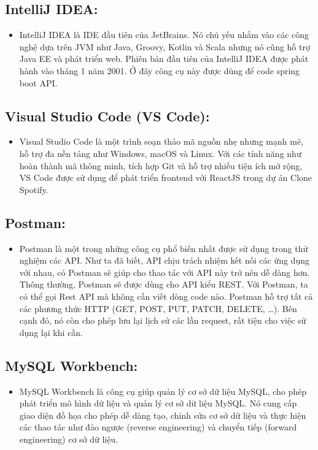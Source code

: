 \subsection{IntelliJ IDEA:}
\begin{itemize}
    \item IntelliJ IDEA là IDE đầu tiên của JetBrains. Nó chủ yếu nhắm vào các công nghệ dựa trên JVM như Java, Groovy, Kotlin và Scala nhưng nó cũng hỗ trợ Java EE và phát triển web. Phiên bản đầu tiên của IntelliJ IDEA được phát hành vào tháng 1 năm 2001. Ở đây công cụ này được dùng để code spring boot API.
\end{itemize}

\subsection{Visual Studio Code (VS Code):}
\begin{itemize}
    \item Visual Studio Code là một trình soạn thảo mã nguồn nhẹ nhưng mạnh mẽ, hỗ trợ đa nền tảng như Windows, macOS và Linux. Với các tính năng như hoàn thành mã thông minh, tích hợp Git và hỗ trợ nhiều tiện ích mở rộng, VS Code được sử dụng để phát triển frontend với ReactJS trong dự án Clone Spotify.
\end{itemize}

\subsection{Postman:}
\begin{itemize}
    \item Postman là một trong những công cụ phổ biến nhất được sử dụng trong thử nghiệm các API. Như ta đã biết, API chịu trách nhiệm kết nối các ứng dụng với nhau, có Postman sẽ giúp cho thao tác với API này trở nên dễ dàng hơn. Thông thường, Postman sẽ được dùng cho API kiểu REST. Với Postman, ta có thể gọi Rest API mà không cần viết dòng code nào. Postman hỗ trợ tất cả các phương thức HTTP (GET, POST, PUT, PATCH, DELETE, …). Bên cạnh đó, nó còn cho phép lưu lại lịch sử các lần request, rất tiện cho việc sử dụng lại khi cần.
\end{itemize}

\subsection{MySQL Workbench:}
\begin{itemize}
    \item MySQL Workbench là công cụ giúp quản lý cơ sở dữ liệu MySQL, cho phép phát triển mô hình dữ liệu và quản lý cơ sở dữ liệu MySQL. Nó cung cấp giao diện đồ họa cho phép dễ dàng tạo, chỉnh sửa cơ sở dữ liệu và thực hiện các thao tác như đảo ngược (reverse engineering) và chuyển tiếp (forward engineering) cơ sở dữ liệu.
\end{itemize}

